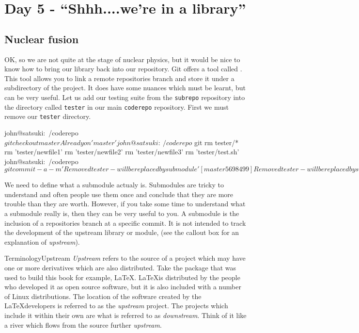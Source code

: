 \section{Day 5 - ``Shhh....we're in a library''}
\subsection{Nuclear fusion}
OK, so we are not quite at the stage of nuclear physics, but it would be nice to know how to bring our library back into our repository.
Git offers a tool called .  This tool allows you to link a remote repositories branch and store it under a subdirectory of the project.
It does have some nuances which must be learnt, but can be very useful.
Let us add our testing suite from the \texttt{subrepo} repository into the directory called \texttt{tester} in our main \texttt{coderepo} repository.
First we must remove our \texttt{tester} directory.

\begin{code}
john@satsuki:~/coderepo$ git checkout master 
Already on 'master'
john@satsuki:~/coderepo$ git rm tester/*
rm 'tester/newfile1'
rm 'tester/newfile2'
rm 'tester/newfile3'
rm 'tester/test.sh'
john@satsuki:~/coderepo$ git commit -a -m 'Removed tester - will be replaced by submodule'
[master 5698499] Removed tester - will be replaced by submodule
 4 files changed, 0 insertions(+), 20 deletions(-)
 delete mode 100644 tester/newfile1
 delete mode 100644 tester/newfile2
 delete mode 100644 tester/newfile3
 delete mode 100755 tester/test.sh
john@satsuki:~/coderepo$ 
\end{code}

We need to define what a submodule actualy is.
Submodules are tricky to understand and often people use them once and conclude that they are more trouble than they are worth.
However, if you take some time to understand what a submodule really is, then they can be very useful to you.
A submodule is the inclusion of a repositories branch at a specific commit.
It is not intended to track the development of the upstream library or module, (see the callout box for an explanation of \emph{upstream}).

\begin{callout}{Terminology}{Upstream}
\emph{Upstream} refers to the source of a project which may have one or more derivatives which are also distributed.
Take the package that was used to build this book for example, \LaTeX.
\LaTeX is distributed by the people who developed it as open source software, but it is also included with a number of Linux distributions.
The location of the software created by the \LaTeX developers is referred to as the \emph{upstream} project.
The projects which include it within their own are what is referred to as \emph{downstream}.
Think of it like a river which flows from the source further \emph{upstream}.
\end{callout}

